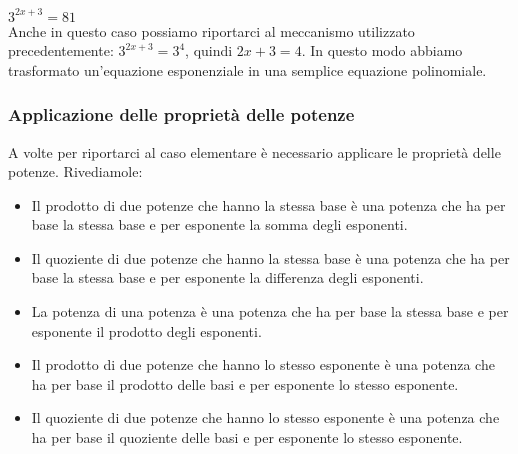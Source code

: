 \begin{esempio}
\(3^{2x+3}=81\)\\[4pt] Anche in questo caso possiamo riportarci al 
meccanismo utilizzato precedentemente: \(3^{2x+3}=3^4\), quindi 
\({2x+3}=4\). In questo modo abbiamo trasformato un'equazione esponenziale 
in una semplice equazione polinomiale.
\end{esempio}

\subsubsection{Applicazione delle proprietà delle potenze}
\label{subsubsec:esplog_eq_proprpot}

A volte per riportarci al caso elementare è necessario applicare le 
proprietà delle potenze. Rivediamole:

\begin{itemize} %
 \item {}
 Il prodotto di due  potenze che hanno la stessa base è una potenza che ha 
per base la stessa base e per esponente la somma degli esponenti.
 \item {}
 Il quoziente di due  potenze che hanno la stessa base è una potenza che ha 
per base la stessa base e per esponente la differenza degli esponenti.
 \item {}
 La potenza di una potenza è una potenza che ha per base la stessa base e 
per esponente il prodotto degli esponenti.
 \item {}
 Il prodotto di due  potenze che hanno lo stesso esponente è una potenza 
che ha per base il prodotto delle basi e per esponente lo stesso esponente.
 \item {}
 Il quoziente di due  potenze che hanno lo stesso esponente è una potenza 
che ha per base il quoziente delle basi e per esponente lo stesso esponente.
\end{itemize}

